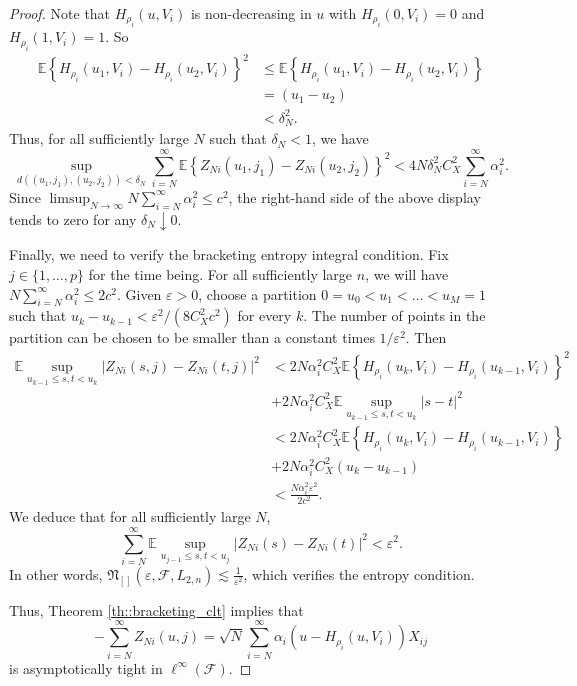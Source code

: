\documentclass[10pt,a4paper]{amsart}
\newcommand{\E}{\mathbb{E}}
\begin{document}
\begin{proof}
Note that $H_{\rho_{i}}(u,V_{i})$ is non-decreasing in $u$ with $H_{\rho_{i}}(0,V_{i}) = 0$ and $H_{\rho_{i}}(1,V_{i}) = 1$. So
\begin{align*}
    \E\left\{H_{\rho_{i}}(u_{1},V_{i})-H_{\rho_{i}}(u_{2},V_{i})\right\}^{2} &\leq \E\left\{H_{\rho_{i}}(u_{1},V_{i})-H_{\rho_{i}}(u_{2},V_{i})\right\} \\
    &= (u_{1}-u_{2})\\
    &< \delta_{N}^{2}.
\end{align*}
Thus, for all sufficiently large $N$ such that $\delta_{N} < 1$, we have
\begin{equation*}
    \sup_{d((u_{1},j_{1}),(u_{2},j_{2})) <\delta_{N}} \sum_{i=N}^{\infty}\E\left\{Z_{Ni}(u_{1}, j_{1})-Z_{Ni}(u_{2}, j_{2})\right\}^{2} < 4N\delta_{N}^{2} C_{X}^{2}\sum_{i=N}^{\infty} \alpha_{i}^{2}.
\end{equation*}
Since $\limsup_{N \rightarrow \infty} N \sum_{i=N}^{\infty} \alpha_{i}^{2} \leq c^{2}$, the right-hand side of the above display tends to zero for any $\delta_{N} \downarrow 0$.

Finally, we need to verify the bracketing entropy integral condition. Fix $j \in \{1,\ldots, p\}$ for the time being. For all sufficiently large $n$, we will have $N \sum_{i=N}^{\infty} \alpha_{i}^{2} \leq 2c^{2}$. Given $\varepsilon > 0$, choose a partition $0 = u_{0} < u_{1} < \ldots < u_{M} = 1$ such that $u_{k} - u_{k-1} < \varepsilon^{2}/(8C_{X}^{2}c^{2})$ for every $k$. The number of points in the partition can be chosen to be smaller than a constant times $1/\varepsilon^{2}$. Then
\begin{align*}
    \E \sup_{u_{k-1} \leq s,t < u_{k}} |Z_{Ni}(s,j) - Z_{Ni}(t,j)|^{2} &< 2N\alpha^{2}_{i}C_{X}^{2}\E\left\{H_{\rho_{i}}(u_{k},V_{i})-H_{\rho_{i}}(u_{k-1},V_{i})\right\}^{2}\\
    &+ 2N\alpha^{2}_{i}C_{X}^{2}\E \sup_{u_{k-1} \leq s,t < u_{k}} |s-t|^{2} \\
    &< 2N\alpha^{2}_{i}C_{X}^{2} \E\left\{H_{\rho_{i}}(u_{k},V_{i})-H_{\rho_{i}}(u_{k-1},V_{i})\right\}\\
    &+ 2N\alpha^{2}_{i}C_{X}^{2}(u_{k} - u_{k-1}) \\
    &< \frac{N \alpha_{i}^{2}\varepsilon^{2}}{2c^{2}}.
\end{align*}
We deduce that for all sufficiently large $N$,
\begin{equation*}
    \sum_{i=N}^{\infty}\E \sup_{u_{j-1} \leq s,t < u_{j}} |Z_{Ni}(s) - Z_{Ni}(t)|^{2} < \varepsilon^{2}.
\end{equation*}
In other words, $\mathfrak{N}_{[]}(\varepsilon, \mathcal{F}, L_{2,n}) \lesssim \frac{1}{\varepsilon^{2}}$, which verifies the entropy condition. 

Thus, {Theorem \ref{th::bracketing_clt}} implies that
\begin{equation*}
    -\sum_{i=N}^{\infty} Z_{Ni}(u,j) = \sqrt{N}\sum_{i=N}^{\infty}\alpha_{i}(u - H_{\rho_{i}}(u,V_{i}))X_{ij}
\end{equation*}
is asymptotically tight in $\ell^{\infty}(\mathcal{F})$.
\end{proof}
\end{document}
